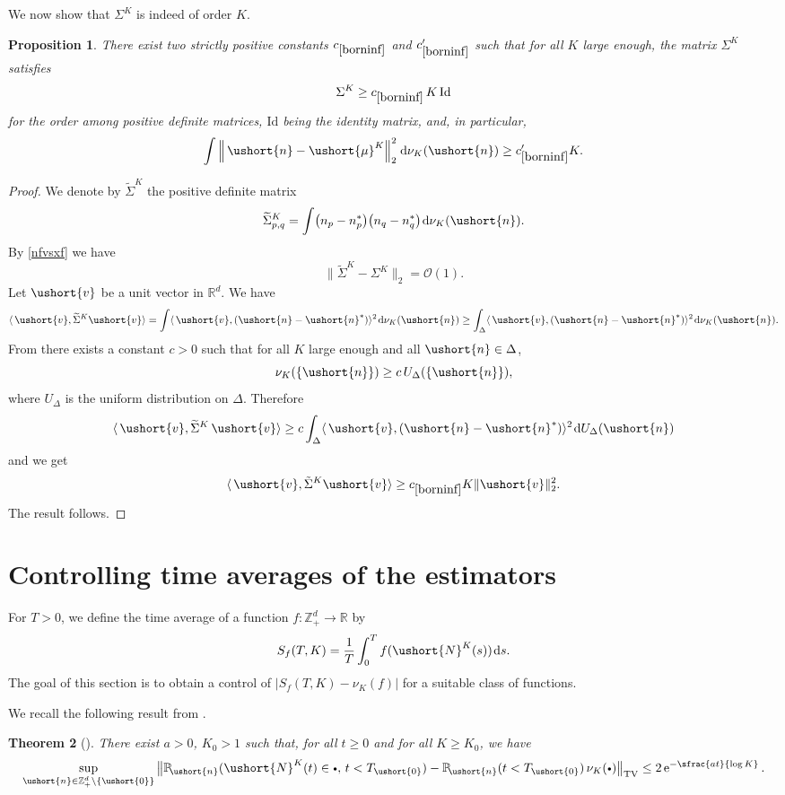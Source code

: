 \documentclass[JEP,XML,SOM,Unicode]{cedram}
\newcommand{\sbullet}{{\scriptscriptstyle\bullet}}
\newcommand{\csbullet}{{\raisebox{1pt}{$\sbullet$}}}
\let\backslash\setminus
\let\mathcal\mathscr
\numberwithin{equation}{section}
\theoremstyle{plain}
\newtheorem{theorem}{Theorem}[section]
\newtheorem{proposition}[theorem]{Proposition}
\theoremstyle{definition}
\newcommand{\pcte}[1]{c_{\eqref{#1}}}
\newcommand{\proba}{{\mathbb{P}}}
\newcommand{\real}{\mathbb{R}}
\newcommand{\zentiers}{{\mathbb{Z}}}
\newcommand{\domaine}{\zentiers_{+}^{d}}
\newcommand{\sdomaine}{{\zentiers}_+^d}
\newcommand{\Oun}{\mathcal{O}(1)}
\newcommand{\sK}{K}
\newcommand{\vecn}{\ushort{n}}
\newcommand{\vecnf}{\ushort{n}^*}
\newcommand{\vecv}{\ushort{v}}
\newcommand{\vmu}{\ushort{\mu}}
\newcommand{\veczer}{\ushort{0}}
\newcommand{\sDelta}{\Delta}
\newcommand{\leproc}{\ushort{N}^{K}}
\newcommand{\nuk}{\nu_{K}}\let\snuk\nuk
\newcommand{\e}{\operatorname{e}}
\newcommand{\dd}{\hspace{1pt}\mathrm{d}}
\begin{document}
We now show that $\Sigma^{\sK}$ is indeed of order $K$.
\begin{proposition}\label{borninf}
There exist two strictly positive constants $\pcte{borninf}$ and $\pcte{borninf}'$ such that for all $K$ large enough, the matrix $\Sigma^{\sK}$ satisfies
\[
\Sigma^{\sK}\ge \pcte{borninf} \, K \, \mathrm{Id}
\]
for the order among positive definite matrices, $\mathrm{Id}$ being the identity matrix, and, in particular,
\[
\int \left\|\,\vecn-\vmu^{\sK}\right\|_{2}^2\dd\nuk(\vecn)
\geq \pcte{borninf}' K.
\]
\end{proposition}
\begin{proof}
We denote by $\widetilde\Sigma^{\sK}$ the positive definite matrix
\[
\widetilde\Sigma^{\sK}_{p,q}= \int \bigl(n_{p}-n_{p}^*\bigr)
\bigl(n_{q}-n_{q}^*\bigr)\dd\nuk(\vecn).
\]
By \eqref{nfvsxf} we have
\begin{equation}\label{comparaisondescov}
\big\|\widetilde\Sigma^{\sK}-\Sigma^{\sK}\big\|_{2}=\Oun.
\end{equation}
Let $\vecv$ be a unit vector in $\real^{d}$. We have
\[
\langle\, \vecv,\widetilde\Sigma^{\sK}\vecv\rangle=
\int \langle\, \vecv,(\vecn-\vecnf)\rangle^2\dd\nuk(\vecn)\ge
\int_{\sDelta}\langle\, \vecv,(\vecn-\vecnf)\rangle^2\dd\nuk(\vecn).
\]
From \cite[Lem.\,5.3]{ccm2} there exists a constant $c>0$ such that for all $K$ large enough and all $\vecn\in \Delta$,
\[
{\nuk}(\{\vecn\})\geq c\, U_{\Delta}(\{\vecn\}),
\]
where $U_{\Delta}$ is the uniform distribution on $\Delta$.
Therefore
\[
\langle\, \vecv, \widetilde\Sigma^{\sK}\,\vecv\rangle\ge
c \int_{\Delta} \langle\, \vecv,(\vecn-\vecnf)\rangle^2
\dd U_{\Delta}(\vecn)
\]
and we get
\[
\langle\, \vecv,\tilde\Sigma^{\sK}\vecv\rangle\geq \pcte{borninf} K\|\vecv\|_{2}^2.
\]
The result follows.
\end{proof}

\section{Controlling time averages of the estimators}
\label{sec:process}

For $T>0$, we define the time average of a function $f:\domaine\to\real$ by
\begin{equation}
\label{statf}
S_{f}(T,K)=\frac{1}{T}\int_{0}^{T}f(\leproc(s)) \dd s.
\end{equation}
The goal of this section is to obtain a control of $|S_{f}(T,K)-\nuk(f)|$ for a suitable class of functions.

We recall the following result from \cite[Th.\,3.1]{ccm2}.
\begin{theorem}[\cite{ccm2}]\label{decor-thm}
There exist $a>0$, $K_0>1$ such that, for all
$t\geq 0$ and for all $K\geq K_0$, we have
\begin{equation}\label{decor}
\sup_{\vecn\in\sdomaine\backslash\{\veczer\}}
\big\| \proba\!_{\vecn}(\leproc(t)\in \csbullet ,\, t< T_{\veczer}) -\proba\!_{\vecn}(t< T_{\veczer})
\,\nuk(\csbullet)\big\|_{{ \mathrm{TV}}} \leq 2\e^{-\sfrac{at}{\log K}}.
\end{equation}
\end{theorem}
\end{document}
